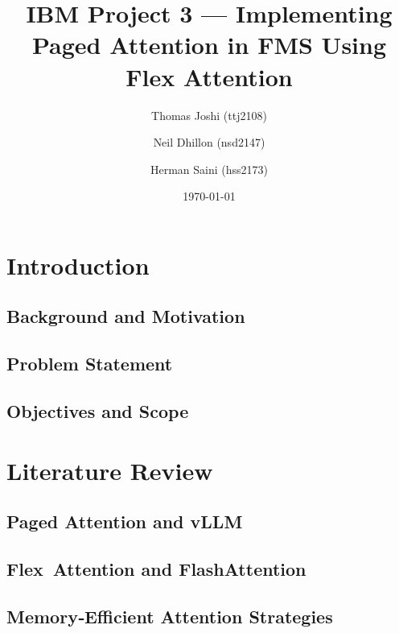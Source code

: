 \documentclass[11pt]{article}
\title{IBM Project 3 --- Implementing Paged Attention in FMS Using Flex Attention}
\author{
  Thomas Joshi (ttj2108) \and
  Neil Dhillon (nsd2147) \and
  Herman Saini (hss2173)
}
\date{\today}
\begin{document}
\maketitle
\begin{abstract}
\end{abstract}

\tableofcontents
\newpage

\section{Introduction}
  \subsection{Background and Motivation}
  
  \subsection{Problem Statement}
  
  \subsection{Objectives and Scope}

\section{Literature Review}
  \subsection{Paged Attention and vLLM}

  \subsection{Flex Attention and FlashAttention}

  \subsection{Memory‑Efficient Attention Strategies}
\end{document}
